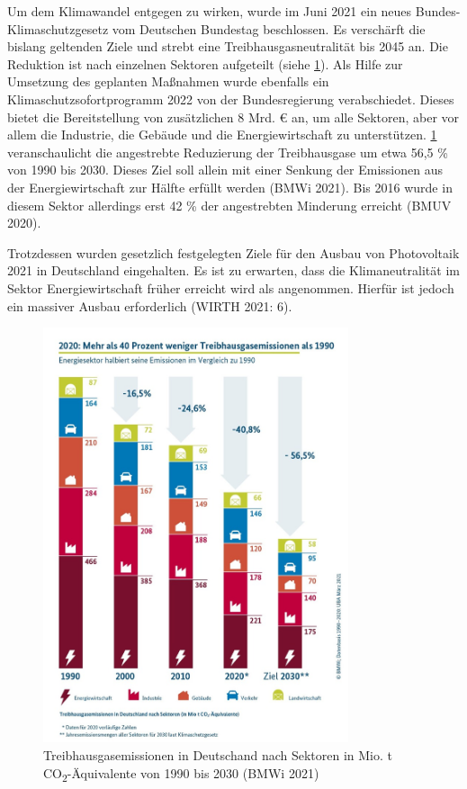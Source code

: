 \documentclass[11pt]{scrartcl}
\begin{document}
Um dem Klimawandel entgegen zu wirken, wurde im Juni 2021 ein neues Bundes-Klimaschutzgesetz vom Deutschen Bundestag beschlossen.
Es verschärft die bislang geltenden Ziele und strebt eine Treibhausgasneutralität bis 2045 an.
Die Reduktion ist nach einzelnen Sektoren aufgeteilt (siehe \cref{fig:CO2}).
Als Hilfe zur Umsetzung des geplanten Maßnahmen wurde ebenfalls ein Klimaschutzsofortprogramm 2022 von der Bundesregierung verabschiedet.
Dieses bietet die Bereitstellung von zusätzlichen 8 Mrd. € an, um alle Sektoren, aber vor allem die Industrie, die Gebäude und die Energiewirtschaft zu unterstützen.
\cref{fig:CO2} veranschaulicht die angestrebte Reduzierung der Treibhausgase um etwa 56,5 \% von 1990 bis 2030.
Dieses Ziel soll allein mit einer Senkung der Emissionen aus der Energiewirtschaft zur Hälfte erfüllt werden (BMWi 2021).
Bis 2016 wurde in diesem Sektor allerdings erst 42 \% der angestrebten Minderung erreicht (BMUV 2020).

Trotzdessen wurden gesetzlich festgelegten Ziele für den Ausbau von Photovoltaik 2021 in Deutschland eingehalten.
Es ist zu erwarten, dass die Klimaneutralität im Sektor Energiewirtschaft früher erreicht wird als angenommen.
Hierfür ist jedoch ein massiver Ausbau erforderlich (WIRTH 2021: 6).


\begin{figure}
\centering
\includegraphics[width=0.8\textwidth]{Sophie/co2.jpg}
\caption[Treibhausgasemissionen in Deutschand nach Sektoren in Mio. t CO\textsubscript{2}-Äquivalente von 1990 bis 2030]{Treibhausgasemissionen in Deutschand nach Sektoren in Mio. t CO\textsubscript{2}-Äquivalente von 1990 bis 2030 (BMWi 2021)}
\label{fig:CO2}
\end{figure}
\end{document}
